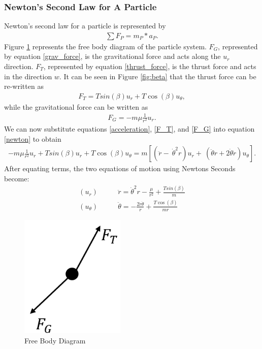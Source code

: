 \documentclass[]{article}
\begin{document}
	\subsubsection{Newton's Second Law for A Particle}
	Newton's second law for a particle is represented by
	\begin{align}
		\sum{F_{P}} = m_{P} * a_{P}. \label{newton}
	\end{align}
	\vspace{2mm}\newline
	Figure \ref{fig:FBD} represents the free body diagram of the particle system. \(F_{G}\), represented by equation \ref{grav_force}, is the gravitational force and acts along the \(u_{r}\) direction. \(F_{T}\), represented by equation \ref{thrust_force}, is the thrust force and acts in the direction \(w\). It can be seen in Figure \ref{fig:beta} that the thrust force can be re-written as 
	\begin{align}
		F_{T} = Tsin(\beta)u_{r} + T\cos(\beta)u_{\theta}, \label{F_T}
	\end{align}
	while the gravitational force can be written as
	\begin{align}
		F_{G} = -m\mu\frac{1}{r^2}u_{r}. \label{F_G}
	\end{align}
	We can now substitute equations \ref{acceleration},  \ref{F_T}, and \ref{F_G} into equation \ref{newton} to obtain
	\begin{align*}
		-m\mu\frac{1}{r^2}u_{r} + Tsin(\beta)u_{r} + T\cos(\beta)u_{\theta} = m[(\ddot{r} -\ \dot{\theta}^2r)u_{r} +\ (\ddot{\theta}r+2\dot{\theta}\dot{r})u_{\theta}]. 
	\end{align*}
	After equating terms, the two equations of motion using Newtons Seconds become:
	\begin{align}
		(u_{r})\qquad      &  \ddot{r}      = \dot{\theta}^2r - \frac{\mu}{r^2} + \frac{Tsin(\beta)}{m} \label{eom1}\\
		(u_{\theta})\qquad &  \ddot{\theta} = -\frac{2\dot{r}\dot{\theta}}{r}   + \frac{T\cos(\beta)}{mr} \label{eom2}
	\end{align}
	\begin{figure}
		\centering
		\includegraphics[width=50mm,scale=0.5]{FBD.png}
		\caption{Free Body Diagram}
		\label{fig:FBD}
	\end{figure}
\end{document}
